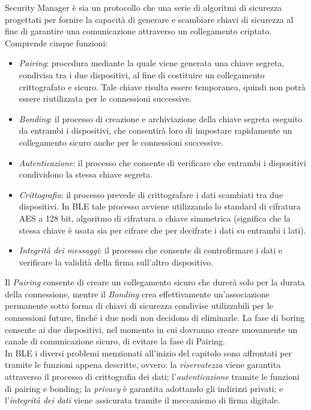\noindent Security Manager è sia un protocollo che una serie di algoritmi di sicurezza progettati per fornire la capacità di generare e scambiare chiavi di sicurezza al fine di garantire una comunicazione attraverso un collegamento criptato. Comprende cinque funzioni:
\begin{itemize}
    \item \textit{Pairing}: procedura mediante la quale viene generata una chiave segreta, condivisa tra i due dispositivi, al fine di costituire un collegamento crittografato e sicuro. Tale chiave risulta essere temporanea, quindi non potrà essere riutilizzata per le connessioni successive.
    
    \item \textit{Bonding}: il processo di creazione e archiviazione della chiave segreta eseguito da entrambi i dispositivi, che consentirà loro di impostare rapidamente un collegamento sicuro anche per le connessioni successive.
    
    \item \textit{Autenticazione}: il processo che consente di verificare che entrambi i dispositivi condividono la stessa chiave segreta.
    
    \item \textit{Crittografia}: il processo prevede di crittografare i dati scambiati tra due dispositivi. In BLE tale processo avviene utilizzando lo standard di cifratura AES a 128 bit, algoritmo di cifratura a chiave simmetrica (significa che la stessa chiave è usata sia per cifrare che per decifrate i dati su entrambi i lati).
    
    \item \textit{Integrità dei messaggi}: il processo che consente di controfirmare i dati e verificare la validità della firma sull'altro dispositivo.
\end{itemize}
Il \textit{Pairing} consente di creare un collegamento sicuro che durerà solo per la durata della connessione, mentre il \textit{Bonding} crea effettivamente un'associazione permanente sotto forma di chiavi di sicurezza condivise utilizzabili per le connessioni future, finché i due nodi non decidono di eliminarle. La fase di boring consente ai due dispositivi, nel momento in cui dovranno creare nuovamente un canale di comunicazione sicuro, di evitare la fase di Pairing.\\

\noindent In BLE i diversi problemi menzionati all'inizio del capitolo sono affrontati per tramite le funzioni appena descritte, ovvero: la \textit{riservatezza} viene garantita attraverso il processo di crittografia dei dati; l'\textit{autenticazione} tramite le funzioni di pairing e bonding; la \textit{privacy} è garantita adottando gli indirizzi privati; e l'\textit{integrità dei dati} viene assicurata tramite il meccanismo di firma digitale.


